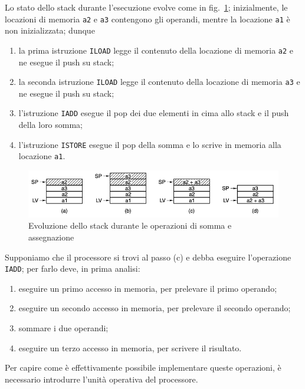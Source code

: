 \documentclass[a4paper,12pt]{scrreprt}
\begin{document}
Lo stato dello stack durante l'esecuzione evolve come in
fig.~\ref{fig:stack_add}; inizialmente, le locazioni di memoria \lstinline{a2} e
\lstinline{a3} contengono gli operandi, mentre la locazione \lstinline{a1} è non
inizializzata; dunque
\renewcommand{\labelenumi}{(\alph{enumi})}
\begin{enumerate}
  \item la prima istruzione \lstinline{ILOAD} legge il contenuto della locazione
  di memoria \lstinline{a2} e ne esegue il push su stack;
  \item la seconda istruzione \lstinline{ILOAD} legge il contenuto della
  locazione di memoria \lstinline{a3} e ne esegue il push su stack;
  \item l'istruzione \lstinline{IADD} esegue il pop dei due elementi in cima
  allo stack e il push della loro somma;
  \item l'istruzione \lstinline{ISTORE} esegue il pop della somma e lo scrive in
  memoria alla locazione \lstinline{a1}.
\end{enumerate}
\renewcommand{\labelenumi}{\arabic{enumi}.}

\begin{figure}
  \centering
  \includegraphics[width=\textwidth]{stack_add.png}
  \caption{Evoluzione dello stack durante le operazioni di somma e
    assegnazione}\label{fig:stack_add}
\end{figure}

Supponiamo che il processore si trovi al passo (c) e debba eseguire l'operazione
\lstinline{IADD}; per farlo deve, in prima analisi:
\begin{enumerate}
  \item eseguire un primo accesso in memoria, per prelevare il primo operando;
  \item eseguire un secondo accesso in memoria, per prelevare il secondo
  operando;
  \item sommare i due operandi;
  \item eseguire un terzo accesso in memoria, per scrivere il risultato.
\end{enumerate}

Per capire come è effettivamente possibile implementare queste operazioni, è
necessario introdurre l'unità operativa del processore.
\end{document}
